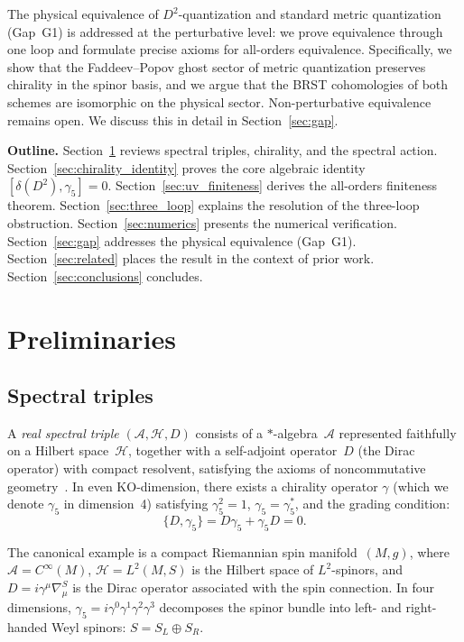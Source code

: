 \documentclass[12pt,a4paper]{article}
\theoremstyle{definition}
\theoremstyle{remark}
\newcommand{\Hilb}{\mathcal{H}}
\newcommand{\Alg}{\mathcal{A}}
\begin{document}
The physical equivalence of $D^2$-quantization and standard metric
quantization (Gap~G1) is addressed at the perturbative level: we prove
equivalence through one loop and formulate precise axioms for all-orders
equivalence.  Specifically, we show that the Faddeev--Popov ghost sector
of metric quantization preserves chirality in the spinor basis, and we
argue that the BRST cohomologies of both schemes are isomorphic on the
physical sector.  Non-perturbative equivalence remains open.  We discuss
this in detail in Section~\ref{sec:gap}.

\medskip
\noindent\textbf{Outline.}
Section~\ref{sec:prelim} reviews spectral triples, chirality, and the
spectral action.  Section~\ref{sec:chirality_identity} proves the core
algebraic identity $[\delta(D^2), \gamma_5] = 0$.
Section~\ref{sec:uv_finiteness} derives the all-orders finiteness theorem.
Section~\ref{sec:three_loop} explains the resolution of the three-loop
obstruction.  Section~\ref{sec:numerics} presents the numerical verification.
Section~\ref{sec:gap} addresses the physical equivalence (Gap~G1).
Section~\ref{sec:related} places the result in the context of prior work.
Section~\ref{sec:conclusions} concludes.

\section{Preliminaries}
\label{sec:prelim}

\subsection{Spectral triples}

A \emph{real spectral triple} $(\Alg, \Hilb, D)$ consists of a
$*$-algebra~$\Alg$ represented faithfully on a Hilbert space~$\Hilb$, together
with a self-adjoint operator~$D$ (the Dirac operator) with compact resolvent,
satisfying the axioms of noncommutative
geometry~\cite{Connes:1994book, Connes:1995cr, Connes:2008vs}.  In even
KO-dimension, there exists a chirality operator $\gamma$ (which we denote
$\gamma_5$ in dimension~4) satisfying $\gamma_5^2 = 1$, $\gamma_5 = \gamma_5^*$,
and the grading condition:
\begin{equation}\label{eq:chirality_grading}
  \{D, \gamma_5\} = D\gamma_5 + \gamma_5 D = 0.
\end{equation}

The canonical example is a compact Riemannian spin manifold~$(M, g)$, where
$\Alg = C^\infty(M)$, $\Hilb = L^2(M, S)$ is the Hilbert space of
$L^2$-spinors, and $D = i\gamma^\mu\nabla_\mu^S$ is the Dirac operator
associated with the spin connection.  In four dimensions,
$\gamma_5 = i\gamma^0\gamma^1\gamma^2\gamma^3$ decomposes the spinor bundle into
left- and right-handed Weyl spinors: $S = S_L \oplus S_R$.
\end{document}
